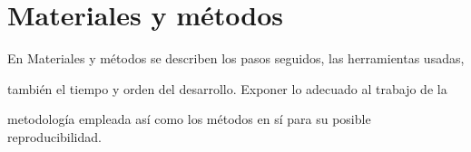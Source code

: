 \newpage\mbox{}\thispagestyle{empty}

\chapter{Materiales y métodos}

En Materiales y métodos se describen los pasos seguidos, las herramientas usadas, 

también el tiempo y orden del desarrollo. Exponer lo adecuado al trabajo de la 

metodología empleada así como los métodos en sí para su posible reproducibilidad.


